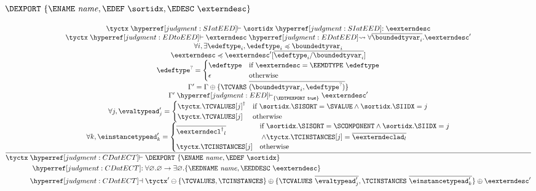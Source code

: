 \subsubsection{$\DEXPORT~\{ \ENAME~\name, \EDEF~\sortidx, \EDESC~\externdesc \}$}
\[
  \frac{
    \begin{array}{@{}c@{}}
      \tyctx \vdashh!SIatEED! \sortidx \trelh!SIatEED! \eexterndesc\\
      \tyctx \vdashh!EDtoEED! \externdesc \leadstoh!EDatEED! \forall\overline{\boundedtyvar_i}.\eexterndesc'\\
      \forall i, \exists \edeftype_i, \edeftype_i \subtypeof \boundedtyvar_i\\
      \eexterndesc \subtypeof \eexterndesc'[\overline{\edeftype_i/\boundedtyvar_i}]\\
      \edeftype^? =
      \begin{cases}
        \edeftype & \text{if } \eexterndesc = \EEMDTYPE~\edeftype\\
        \epsilon & \text{otherwise}
      \end{cases}\\
      \Gamma' = \Gamma \oplus \{ \TCVARS~\overline{(\boundedtyvar_i,\edeftype^?)} \}\\
      \Gamma' \vdashh!EED!_{\{\EDTPEXPORT~\true\}} \eexterndesc'\\
    \forall j, \evaltypead'_j = \begin{cases}
      \tyctx.\TCVALUES[j]^\dagger&\text{if }\sortidx.\SISORT=\SVALUE\land \sortidx.\SIIDX = j\\
      \tyctx.\TCVALUES[j]&\text{otherwise}\\
    \end{cases}\\
    \forall k, \einstancetypead'_k = \begin{cases}
      \overline{{\eexterndecl^\dagger}_l}&
        \begin{aligned}
          \text{if }&\sortidx.\SISORT = \SCOMPONENT \land \sortidx.\SIIDX = j\\
          \land{}&\tyctx.\TCINSTANCES[j] = \overline{\eexterndeclad_l}\\
        \end{aligned}\\
      \tyctx.\TCINSTANCES[j]&\text{otherwise}\\
    \end{cases}\\
    \end{array}
  }{
    \begin{aligned}
    \tyctx \vdashh!CDatECT!{}&\DEXPORT~\{ \ENAME~\name, \EDEF~\sortidx \}\\
    \trelh!CDatECT!{}&\forall\varnothing.\varnothing \to \exists\varnothing.\{ \EEDNAME~\name, \EEDDESC~\eexterndesc \}\\
    \dashvh!CDatECT!{}&\tyctx' \ominus \{ \TCVALUES, \TCINSTANCES \} \oplus \{ \TCVALUES~\overline{\evaltypead'_j}, \TCINSTANCES~\overline{\einstancetypead'_k} \} \oplus \eexterndesc'\\
    \end{aligned}
  }
\]
